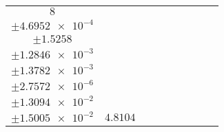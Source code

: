 \documentclass[8pt]{article}
\begin{document}
\begin{longtable}[l]{c c c c c c c c c}
$\num{8}$ & \begin{tabular}[c]{@{}c@{}}$\num{2.1859e-2}$ \\ $\pm\num{4.6952e-4}$\end{tabular} & \begin{tabular}[c]{@{}c@{}}$\num{-0.30351}$ \\ $\pm\num{1.5258}$\end{tabular} & \begin{tabular}[c]{@{}c@{}}$\num{4.5601}$ \\ $\pm\num{1.2846e-3}$\end{tabular} & \begin{tabular}[c]{@{}c@{}}$\num{4.0496e+3}$ \\ $\pm\num{1.3782e-3}$\end{tabular} & \begin{tabular}[c]{@{}c@{}}$\num{8.1013}$ \\ $\pm\num{2.7572e-6}$\end{tabular} & \begin{tabular}[c]{@{}c@{}}$\num{0.64938}$ \\ $\pm\num{1.3094e-2}$\end{tabular} & \begin{tabular}[c]{@{}c@{}}$\num{0.55273}$ \\ $\pm\num{1.5005e-2}$\end{tabular} & $\num{4.8104}$\\
\bottomrule
\end{longtable}
\end{document}
